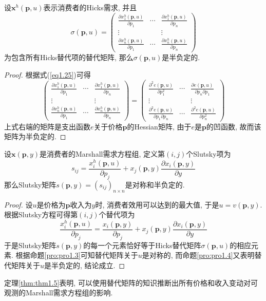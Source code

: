 \documentclass[cn, 12pt, math=mtpro2, bibstyle=apa, blue, twocol]{elegantbook}
\newcommand{\p}{\mathbf{p}}
\newcommand{\x}{\mathbf{x}}
\begin{document}
\begin{proposition}\label{pro:pro1.4}
设$\x^h(\p,u)$表示消费者的Hicks需求, 并且
$$\sigma(\p,u)=\begin{pmatrix}
                 \frac{\partial x_1^h(\p,u)}{\partial p_1} & \cdots & \frac{\partial x_1^h(\p,u)}{\partial p_n} \\
                 \vdots &  & \vdots \\
                 \frac{\partial x_n^h(\p,u)}{\partial p_1} & \cdots & \frac{\partial x_n^h(\p,u)}{\partial p_n}
               \end{pmatrix}$$
为包含所有Hicks替代项的替代矩阵, 那么$\sigma(\p,u)$是半负定的.
\end{proposition}
\begin{proof}
  根据式(\ref{eq1.25})可得
  $$\begin{pmatrix}
                 \frac{\partial x_1^h(\p,u)}{\partial p_1} & \cdots & \frac{\partial x_1^h(\p,u)}{\partial p_n} \\
                 \vdots &  & \vdots \\
                 \frac{\partial x_n^h(\p,u)}{\partial p_1} & \cdots & \frac{\partial x_n^h(\p,u)}{\partial p_n}
               \end{pmatrix}=\begin{pmatrix}
                               \frac{\partial^2 e(\p,u)}{\partial p_1^2} & \cdots & \frac{\partial e(\p,u)}{\partial p_n\partial p_1} \\
                               \vdots &  & \vdots \\
                               \frac{\partial^2 e(\p,u)}{\partial p_1\partial p_n} & \cdots & \frac{\partial^2 e(\p,u)}{\partial p_n^2}
                             \end{pmatrix}$$
  上式右端的矩阵是支出函数$e$关于价格$\p$的Hessian矩阵, 由于$e$是$\p$的凹函数, 故而该矩阵为半负定的.
\end{proof}
\begin{theorem}\label{thm:thm1.5}
  设$\x(\p,y)$是消费者的Marshall需求方程组, 定义第$(i,j)$个Slutsky项为
  $$s_{ij}=\frac{x_i^h(\p,u)}{\partial p_j}+x_j(\p,y)\frac{\partial x_i(\p,y)}{\partial y}$$
  那么Slutsky矩阵$s(\p,y)=(s_{ij})_{n\times n}$是对称和半负定的.
\end{theorem}
\begin{proof}
  设$u$是价格为$\p$收入为$y$时, 消费者效用可以达到的最大值, 于是$u=v(\p,y)$. 根据Slutsky方程可得第$(i,j)$个替代项为
  $$\frac{x_i^h(\p,u)}{\partial p_j}=\frac{x_i(\p,y)}{\partial p_j}+x_j(\p,y)\frac{\partial x_i(\p,y)}{\partial y}$$
  于是Slutsky矩阵$s(\p,y)$的每一个元素恰好等于Hicks替代矩阵$\sigma(\p,u)$的相应元素. 根据命题\ref{pro:pro1.3}可知替代矩阵关于$u$是对称的, 而命题\ref{pro:pro1.4}又表明替代矩阵关于$u$是半负定的, 结论成立.
\end{proof}
定理\ref{thm:thm1.5}表明, 可以使用替代矩阵的知识推断出所有价格和收入变动对可观测的Marshall需求方程组的影响.
\end{document}
